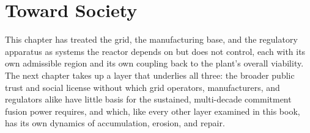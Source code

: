 \section{Toward Society}

This chapter has treated the grid, the manufacturing base, and the regulatory apparatus as systems the reactor depends on but does not control, each with its own admissible region and its own coupling back to the plant's overall viability. The next chapter takes up a layer that underlies all three: the broader public trust and social license without which grid operators, manufacturers, and regulators alike have little basis for the sustained, multi-decade commitment fusion power requires, and which, like every other layer examined in this book, has its own dynamics of accumulation, erosion, and repair.
